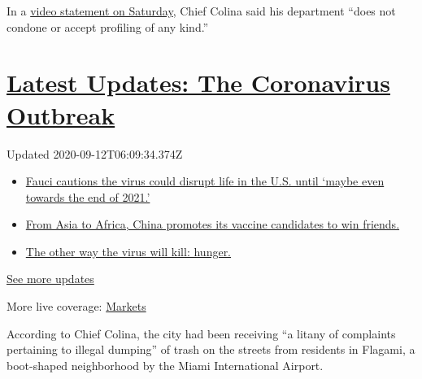 In a \href{https://twitter.com/MiamiPD/status/1249052337680850950}{video
statement on Saturday}, Chief Colina said his department ``does not
condone or accept profiling of any kind.''

\hypertarget{latest-updates-the-coronavirus-outbreak}{%
\section{\texorpdfstring{\href{https://www.nytimes3xbfgragh.onion/2020/09/11/world/covid-19-coronavirus.html?action=click\&pgtype=Article\&state=default\&region=MAIN_CONTENT_1\&context=storylines_live_updates}{Latest
Updates: The Coronavirus
Outbreak}}{Latest Updates: The Coronavirus Outbreak}}\label{latest-updates-the-coronavirus-outbreak}}

Updated 2020-09-12T06:09:34.374Z

\begin{itemize}
\tightlist
\item
  \href{https://www.nytimes3xbfgragh.onion/2020/09/11/world/covid-19-coronavirus.html?action=click\&pgtype=Article\&state=default\&region=MAIN_CONTENT_1\&context=storylines_live_updates\#link-dfb8a16}{Fauci
  cautions the virus could disrupt life in the U.S. until `maybe even
  towards the end of 2021.'}
\item
  \href{https://www.nytimes3xbfgragh.onion/2020/09/11/world/covid-19-coronavirus.html?action=click\&pgtype=Article\&state=default\&region=MAIN_CONTENT_1\&context=storylines_live_updates\#link-7104d154}{From
  Asia to Africa, China promotes its vaccine candidates to win friends.}
\item
  \href{https://www.nytimes3xbfgragh.onion/2020/09/11/world/covid-19-coronavirus.html?action=click\&pgtype=Article\&state=default\&region=MAIN_CONTENT_1\&context=storylines_live_updates\#link-393ad215}{The
  other way the virus will kill: hunger.}
\end{itemize}

\href{https://www.nytimes3xbfgragh.onion/2020/09/11/world/covid-19-coronavirus.html?action=click\&pgtype=Article\&state=default\&region=MAIN_CONTENT_1\&context=storylines_live_updates}{See
more updates}

More live coverage:
\href{https://www.nytimes3xbfgragh.onion/live/2020/09/11/business/stock-market-today-coronavirus?action=click\&pgtype=Article\&state=default\&region=MAIN_CONTENT_1\&context=storylines_live_updates}{Markets}

According to Chief Colina, the city had been receiving ``a litany of
complaints pertaining to illegal dumping'' of trash on the streets from
residents in Flagami, a boot-shaped neighborhood by the Miami
International Airport.

